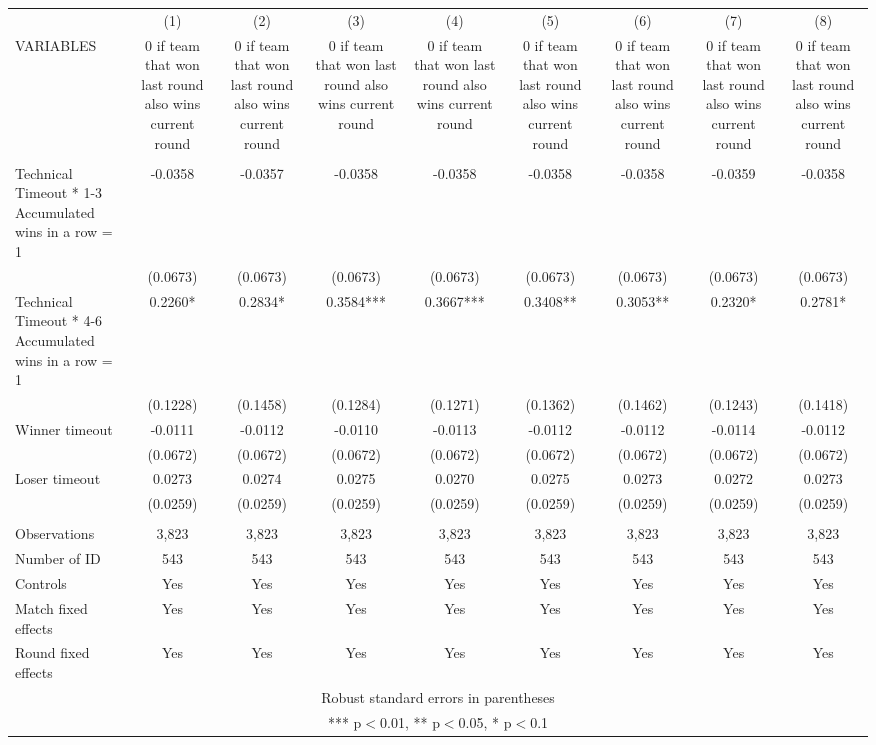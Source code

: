 \documentclass[]{article}
\begin{document}
\begin{tabular}{lcccccccc} \hline
 & (1) & (2) & (3) & (4) & (5) & (6) & (7) & (8) \\
VARIABLES & 0 if team that won last round also wins current round & 0 if team that won last round also wins current round & 0 if team that won last round also wins current round & 0 if team that won last round also wins current round & 0 if team that won last round also wins current round & 0 if team that won last round also wins current round & 0 if team that won last round also wins current round & 0 if team that won last round also wins current round \\ \hline
 &  &  &  &  &  &  &  &  \\
Technical Timeout * 1-3 Accumulated wins in a row = 1 & -0.0358 & -0.0357 & -0.0358 & -0.0358 & -0.0358 & -0.0358 & -0.0359 & -0.0358 \\
 & (0.0673) & (0.0673) & (0.0673) & (0.0673) & (0.0673) & (0.0673) & (0.0673) & (0.0673) \\
Technical Timeout * 4-6 Accumulated wins in a row = 1 & 0.2260* & 0.2834* & 0.3584*** & 0.3667*** & 0.3408** & 0.3053** & 0.2320* & 0.2781* \\
 & (0.1228) & (0.1458) & (0.1284) & (0.1271) & (0.1362) & (0.1462) & (0.1243) & (0.1418) \\
Winner timeout & -0.0111 & -0.0112 & -0.0110 & -0.0113 & -0.0112 & -0.0112 & -0.0114 & -0.0112 \\
 & (0.0672) & (0.0672) & (0.0672) & (0.0672) & (0.0672) & (0.0672) & (0.0672) & (0.0672) \\
Loser timeout & 0.0273 & 0.0274 & 0.0275 & 0.0270 & 0.0275 & 0.0273 & 0.0272 & 0.0273 \\
 & (0.0259) & (0.0259) & (0.0259) & (0.0259) & (0.0259) & (0.0259) & (0.0259) & (0.0259) \\
 &  &  &  &  &  &  &  &  \\
Observations & 3,823 & 3,823 & 3,823 & 3,823 & 3,823 & 3,823 & 3,823 & 3,823 \\
Number of ID & 543 & 543 & 543 & 543 & 543 & 543 & 543 & 543 \\
Controls & Yes & Yes & Yes & Yes & Yes & Yes & Yes & Yes \\
Match fixed effects & Yes & Yes & Yes & Yes & Yes & Yes & Yes & Yes \\
 Round fixed effects & Yes & Yes & Yes & Yes & Yes & Yes & Yes & Yes \\ \hline
\multicolumn{9}{c}{ Robust standard errors in parentheses} \\
\multicolumn{9}{c}{ *** p$<$0.01, ** p$<$0.05, * p$<$0.1} \\
\end{tabular}
\end{document}
